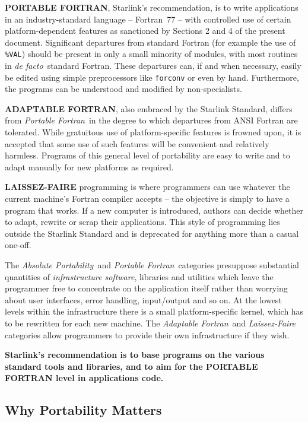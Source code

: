 \documentclass[twoside,11pt]{article}
\renewcommand{\_}{{\tt\char'137}}
\begin{document}
{\bf PORTABLE FORTRAN}, Starlink's recommendation, is to write
applications in an industry-standard language --
Fortran~77 -- with controlled use of certain platform-dependent
features as sanctioned by Sections 2 and 4 of the present document.
Significant departures from
standard Fortran (for example the use of \verb|%VAL|) should be present
in only a small minority of modules, with most routines in {\it de facto}\,
standard Fortran.  These departures can, if and when
necessary, easily be edited using simple preprocessors like
\verb|forconv| or even by hand.  Furthermore, the programs can be
understood and modified by non-specialists.

{\bf ADAPTABLE FORTRAN}, also embraced by the Starlink Standard, differs
from {\it Portable Fortran}\, in the degree to which
departures from ANSI Fortran are tolerated.  While gratuitous use of
platform-specific features is frowned upon, it is accepted that
some use of such features will be convenient and relatively
harmless.  Programs of this general level of portability are easy to
write and to adapt manually for new platforms as required.

{\bf LAISSEZ-FAIRE} programming is where programmers can use whatever the
current machine's Fortran compiler accepts -- the objective is simply
to have a program that works.  If a new computer is introduced,
authors can decide whether to adapt, rewrite or scrap their applications.
This style of programming lies outside the Starlink Standard and
is deprecated for anything more than a casual one-off.

The {\it Absolute Portability}\, and {\it Portable Fortran}\,
categories presuppose substantial quantities of {\it infrastructure
software}, libraries and utilities which leave the
programmer free to concentrate on the application itself rather than
worrying about user interfaces, error handling, input/output and
so on.  At the lowest levels within the infrastructure there is a
small platform-specific kernel, which has to be
rewritten for each new machine.  The {\it Adaptable Fortran}\,
and {\it Laissez-Faire}\, categories allow
programmers to provide their own infrastructure if they wish.

{\bf Starlink's recommendation is to base programs on
the various standard tools and libraries, and to aim for the
PORTABLE FORTRAN level in applications code.}

\subsection{Why Portability Matters}
\end{document}
